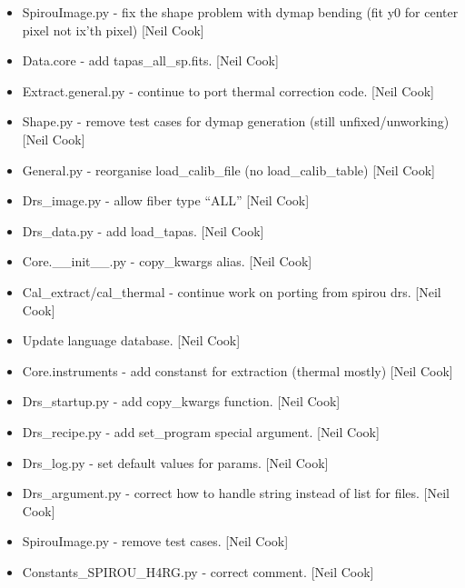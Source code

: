 \documentclass[a4paper,10pt,english]{report}
\begin{document}
\begin{itemize}
\item {} 
SpirouImage.py - fix the shape problem with dymap bending (fit y0 for
center pixel not ix’th pixel) {[}Neil Cook{]}

\item {} 
Data.core - add tapas\_all\_sp.fits. {[}Neil Cook{]}

\item {} 
Extract.general.py - continue to port thermal correction code. {[}Neil
Cook{]}

\item {} 
Shape.py - remove test cases for dymap generation (still
unfixed/unworking) {[}Neil Cook{]}

\item {} 
General.py - reorganise load\_calib\_file (no load\_calib\_table) {[}Neil
Cook{]}

\item {} 
Drs\_image.py - allow fiber type “ALL” {[}Neil Cook{]}

\item {} 
Drs\_data.py - add load\_tapas. {[}Neil Cook{]}

\item {} 
Core.\_\_init\_\_.py - copy\_kwargs alias. {[}Neil Cook{]}

\item {} 
Cal\_extract/cal\_thermal - continue work on porting from spirou drs.
{[}Neil Cook{]}

\item {} 
Update language database. {[}Neil Cook{]}

\item {} 
Core.instruments - add constanst for extraction (thermal mostly) {[}Neil
Cook{]}

\item {} 
Drs\_startup.py - add copy\_kwargs function. {[}Neil Cook{]}

\item {} 
Drs\_recipe.py - add set\_program special argument. {[}Neil Cook{]}

\item {} 
Drs\_log.py - set default values for params. {[}Neil Cook{]}

\item {} 
Drs\_argument.py - correct how to handle string instead of list for
files. {[}Neil Cook{]}

\item {} 
SpirouImage.py - remove test cases. {[}Neil Cook{]}

\item {} 
Constants\_SPIROU\_H4RG.py - correct comment. {[}Neil Cook{]}

\end{itemize}
\end{document}
